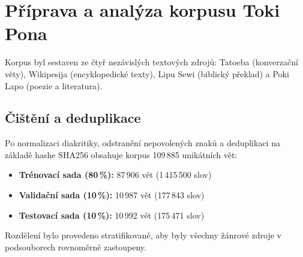 \chapter{Příprava a analýza korpusu Toki Pona}
\label{chap:corpus}

Korpus byl sestaven ze čtyř nezávislých textových zdrojů: Tatoeba (konverzační věty), Wikipesija (encyklopedické texty), Lipu Sewi (biblický překlad) a Poki Lapo (poezie a literatura).

\section{Čištění a deduplikace}
Po normalizaci diakritiky, odstranění nepovolených znaků a deduplikaci na základě hashe SHA256 obsahuje korpus 109\,885 unikátních vět:
\begin{itemize}
    \item \textbf{Trénovací sada (80\,\%):} 87\,906 vět (1\,415\,500 slov)
    \item \textbf{Validační sada (10\,\%):} 10\,987 vět (177\,843 slov)
    \item \textbf{Testovací sada (10\,\%):} 10\,992 vět (175\,471 slov)
\end{itemize}
Rozdělení bylo provedeno stratifikovaně, aby byly všechny žánrové zdroje v podsouborech rovnoměrně zastoupeny.
